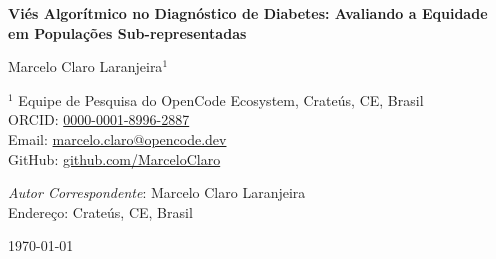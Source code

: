 
\begin{center}
{\Large\bfseries Viés Algorítmico no Diagnóstico de Diabetes: 
Avaliando a Equidade em Populações Sub-representadas\vspace{0.5cm}}

{\large Marcelo Claro Laranjeira$^{1}$\vspace{0.3cm}}

{\small 
$^{1}$ Equipe de Pesquisa do OpenCode Ecosystem, Crateús, CE, Brasil\\
ORCID: \href{https://orcid.org/0000-0001-8996-2887}{0000-0001-8996-2887}\\
Email: \href{mailto:marcelo.claro@opencode.dev}{marcelo.claro@opencode.dev}\\
GitHub: \href{https://github.com/MarceloClaro}{github.com/MarceloClaro}
}
\vspace{0.3cm}

{\small \textit{Autor Correspondente}: Marcelo Claro Laranjeira\\
{\small Endereço: Crateús, CE, Brasil}}
\vspace{0.3cm}

{\small \today}
\end{center}
